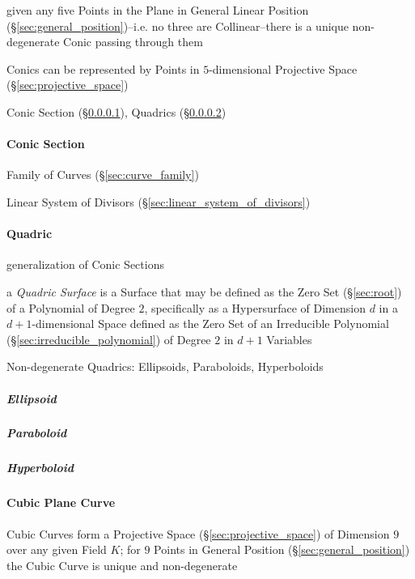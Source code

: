 given any five Points in the Plane in General Linear Position
(\S\ref{sec:general_position})--i.e. no three are Collinear--there is a unique
non-degenerate Conic passing through them

Conics can be represented by Points in $5$-dimensional Projective Space
(\S\ref{sec:projective_space})

\fist Conic Section (\S\ref{sec:conic_section}), Quadrics (\S\ref{sec:quadric})



\paragraph{Conic Section}\label{sec:conic_section}\hfill

Family of Curves (\S\ref{sec:curve_family})

\fist Linear System of Divisors (\S\ref{sec:linear_system_of_divisors})



\paragraph{Quadric}\label{sec:quadric}\hfill

generalization of Conic Sections

a \emph{Quadric Surface} is a Surface that may be defined as the Zero Set
(\S\ref{sec:root}) of a Polynomial of Degree $2$, specifically as a
Hypersurface of Dimension $d$ in a $d+1$-dimensional Space defined as the Zero
Set of an Irreducible Polynomial (\S\ref{sec:irreducible_polynomial}) of Degree
$2$ in $d+1$ Variables

Non-degenerate Quadrics: Ellipsoids, Paraboloids, Hyperboloids



\subparagraph{Ellipsoid}\label{sec:ellipsoid}\hfill

\subparagraph{Paraboloid}\label{sec:paraboloid}\hfill

\subparagraph{Hyperboloid}\label{sec:hyperboloid}\hfill



\paragraph{Cubic Plane Curve}\label{sec:cubic_plane_curve}\hfill

Cubic Curves form a Projective Space (\S\ref{sec:projective_space}) of
Dimension $9$ over any given Field $K$; for $9$ Points in General Position
(\S\ref{sec:general_position}) the Cubic Curve is unique and non-degenerate

